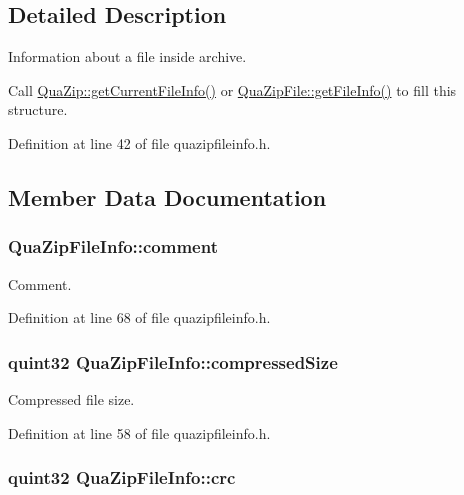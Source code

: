 \subsection{Detailed Description}
Information about a file inside archive. 

Call \hyperlink{class_qua_zip_a9c91a53ed4c2038e153c64bdc097ebe8}{Qua\-Zip\-::get\-Current\-File\-Info()} or \hyperlink{class_qua_zip_file_ad3f5807329321be21b12c1ba5798b359}{Qua\-Zip\-File\-::get\-File\-Info()} to fill this structure. 

Definition at line 42 of file quazipfileinfo.\-h.



\subsection{Member Data Documentation}
\hypertarget{struct_qua_zip_file_info_adc2aad7bbd87ce3415e2a19851266bfc}{
\subsubsection[{comment}]{ Qua\-Zip\-File\-Info\-::comment}}\label{struct_qua_zip_file_info_adc2aad7bbd87ce3415e2a19851266bfc}


Comment. 



Definition at line 68 of file quazipfileinfo.\-h.

\hypertarget{struct_qua_zip_file_info_af6116eaac1f36b2a4b3a6a39851a85cc}{
\subsubsection[{compressed\-Size}]{\setlength{\rightskip}{0pt plus 5cm}quint32 Qua\-Zip\-File\-Info\-::compressed\-Size}}\label{struct_qua_zip_file_info_af6116eaac1f36b2a4b3a6a39851a85cc}


Compressed file size. 



Definition at line 58 of file quazipfileinfo.\-h.

\hypertarget{struct_qua_zip_file_info_aceee045c9ebce0b9724f40d342bc99ea}{
\subsubsection[{crc}]{\setlength{\rightskip}{0pt plus 5cm}quint32 Qua\-Zip\-File\-Info\-::crc}}\label{struct_qua_zip_file_info_aceee045c9ebce0b9724f40d342bc99ea}


